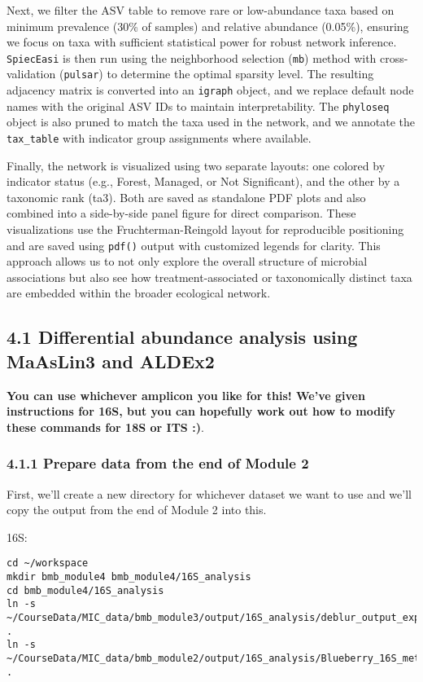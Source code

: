 \documentclass[
]{book}
\begin{document}
Next, we filter the ASV table to remove rare or low-abundance taxa based on minimum prevalence (30\% of samples) and relative abundance (0.05\%), ensuring we focus on taxa with sufficient statistical power for robust network inference. \texttt{SpiecEasi} is then run using the neighborhood selection (\texttt{mb}) method with cross-validation (\texttt{pulsar}) to determine the optimal sparsity level. The resulting adjacency matrix is converted into an \texttt{igraph} object, and we replace default node names with the original ASV IDs to maintain interpretability. The \texttt{phyloseq} object is also pruned to match the taxa used in the network, and we annotate the \texttt{tax\_table} with indicator group assignments where available.

Finally, the network is visualized using two separate layouts: one colored by indicator status (e.g., Forest, Managed, or Not Significant), and the other by a taxonomic rank (ta3). Both are saved as standalone PDF plots and also combined into a side-by-side panel figure for direct comparison. These visualizations use the Fruchterman-Reingold layout for reproducible positioning and are saved using \texttt{pdf()} output with customized legends for clarity. This approach allows us to not only explore the overall structure of microbial associations but also see how treatment-associated or taxonomically distinct taxa are embedded within the broader ecological network.

\subsection{4.1 Differential abundance analysis using MaAsLin3 and ALDEx2}\label{differential-abundance-analysis-using-maaslin3-and-aldex2}

\textbf{You can use whichever amplicon you like for this! We've given instructions for 16S, but you can hopefully work out how to modify these commands for 18S or ITS :)}.

\subsubsection{4.1.1 Prepare data from the end of Module 2}\label{prepare-data-from-the-end-of-module-2}

First, we'll create a new directory for whichever dataset we want to use and we'll copy the output from the end of Module 2 into this.

16S:

\begin{verbatim}
cd ~/workspace
mkdir bmb_module4 bmb_module4/16S_analysis
cd bmb_module4/16S_analysis
ln -s ~/CourseData/MIC_data/bmb_module3/output/16S_analysis/deblur_output_exported/ .
ln -s ~/CourseData/MIC_data/bmb_module2/output/16S_analysis/Blueberry_16S_metadata.tsv .
\end{verbatim}
\end{document}
